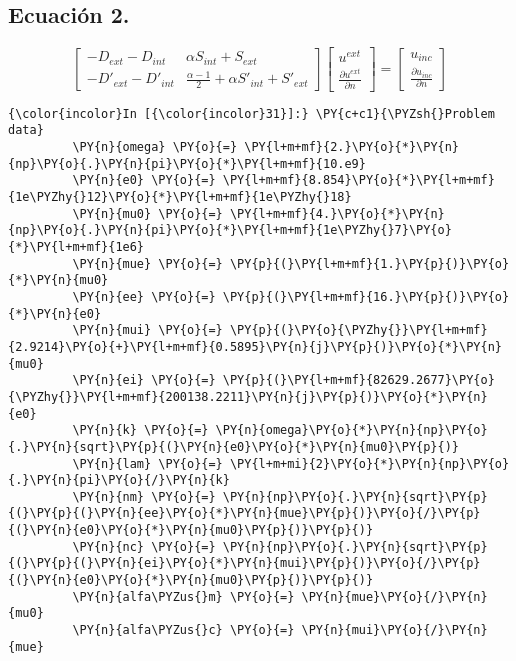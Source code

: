 \documentclass[11pt]{report}
\begin{document}
\subsection{Ecuación 2.}
$$\begin{bmatrix}
-D_{ext}-D_{int} & \alpha S_{int}+S_{ext}\\
-D'_{ext}-D'_{int} & \frac{\alpha-1}{2}+ \alpha S'_{int}+S'_{ext}
\end{bmatrix}
\begin{bmatrix}
u^{ext}\\
\frac{\partial u^{ext}}{\partial n}
\end{bmatrix}
=
\begin{bmatrix}
u_{inc}\\
\frac{\partial u_{inc}}{\partial n}
\end{bmatrix}$$
\begin{tcolorbox}
    \begin{Verbatim}[commandchars=\\\{\}]
{\color{incolor}In [{\color{incolor}31}]:} \PY{c+c1}{\PYZsh{}Problem data}
         \PY{n}{omega} \PY{o}{=} \PY{l+m+mf}{2.}\PY{o}{*}\PY{n}{np}\PY{o}{.}\PY{n}{pi}\PY{o}{*}\PY{l+m+mf}{10.e9}
         \PY{n}{e0} \PY{o}{=} \PY{l+m+mf}{8.854}\PY{o}{*}\PY{l+m+mf}{1e\PYZhy{}12}\PY{o}{*}\PY{l+m+mf}{1e\PYZhy{}18}
         \PY{n}{mu0} \PY{o}{=} \PY{l+m+mf}{4.}\PY{o}{*}\PY{n}{np}\PY{o}{.}\PY{n}{pi}\PY{o}{*}\PY{l+m+mf}{1e\PYZhy{}7}\PY{o}{*}\PY{l+m+mf}{1e6}
         \PY{n}{mue} \PY{o}{=} \PY{p}{(}\PY{l+m+mf}{1.}\PY{p}{)}\PY{o}{*}\PY{n}{mu0}
         \PY{n}{ee} \PY{o}{=} \PY{p}{(}\PY{l+m+mf}{16.}\PY{p}{)}\PY{o}{*}\PY{n}{e0}
         \PY{n}{mui} \PY{o}{=} \PY{p}{(}\PY{o}{\PYZhy{}}\PY{l+m+mf}{2.9214}\PY{o}{+}\PY{l+m+mf}{0.5895}\PY{n}{j}\PY{p}{)}\PY{o}{*}\PY{n}{mu0}
         \PY{n}{ei} \PY{o}{=} \PY{p}{(}\PY{l+m+mf}{82629.2677}\PY{o}{\PYZhy{}}\PY{l+m+mf}{200138.2211}\PY{n}{j}\PY{p}{)}\PY{o}{*}\PY{n}{e0}
         \PY{n}{k} \PY{o}{=} \PY{n}{omega}\PY{o}{*}\PY{n}{np}\PY{o}{.}\PY{n}{sqrt}\PY{p}{(}\PY{n}{e0}\PY{o}{*}\PY{n}{mu0}\PY{p}{)}
         \PY{n}{lam} \PY{o}{=} \PY{l+m+mi}{2}\PY{o}{*}\PY{n}{np}\PY{o}{.}\PY{n}{pi}\PY{o}{/}\PY{n}{k}
         \PY{n}{nm} \PY{o}{=} \PY{n}{np}\PY{o}{.}\PY{n}{sqrt}\PY{p}{(}\PY{p}{(}\PY{n}{ee}\PY{o}{*}\PY{n}{mue}\PY{p}{)}\PY{o}{/}\PY{p}{(}\PY{n}{e0}\PY{o}{*}\PY{n}{mu0}\PY{p}{)}\PY{p}{)}
         \PY{n}{nc} \PY{o}{=} \PY{n}{np}\PY{o}{.}\PY{n}{sqrt}\PY{p}{(}\PY{p}{(}\PY{n}{ei}\PY{o}{*}\PY{n}{mui}\PY{p}{)}\PY{o}{/}\PY{p}{(}\PY{n}{e0}\PY{o}{*}\PY{n}{mu0}\PY{p}{)}\PY{p}{)}
         \PY{n}{alfa\PYZus{}m} \PY{o}{=} \PY{n}{mue}\PY{o}{/}\PY{n}{mu0}
         \PY{n}{alfa\PYZus{}c} \PY{o}{=} \PY{n}{mui}\PY{o}{/}\PY{n}{mue}

\end{Verbatim}
\end{tcolorbox}
\end{document}
